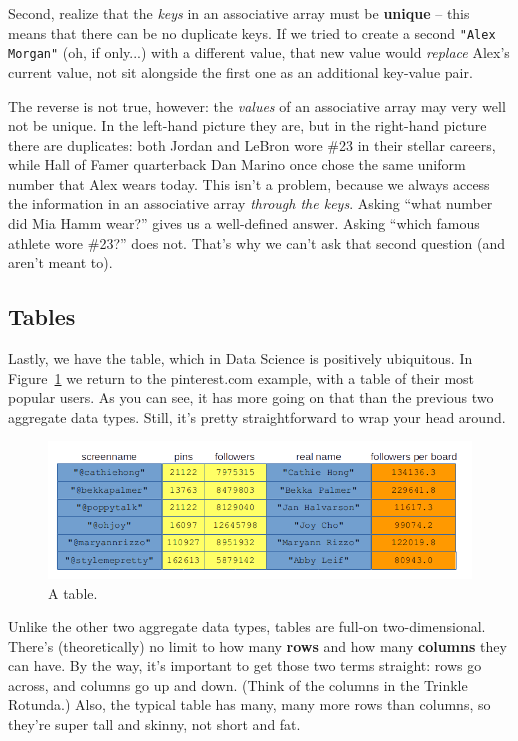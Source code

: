 Second, realize that the \textit{keys} in an associative array must be
\textbf{unique} -- this means that there can be no duplicate keys. If we tried
to create a second \texttt{"Alex Morgan"} (oh, if only...) with a different
value, that new value would \textit{replace} Alex's current value, not sit
alongside the first one as an additional key-value pair.

The reverse is not true, however: the \textit{values} of an associative array
may very well not be unique. In the left-hand picture they are, but in the
right-hand picture there are duplicates: both Jordan and LeBron wore \#23 in
their stellar careers, while Hall of Famer quarterback Dan Marino once chose
the same uniform number that Alex wears today. This isn't a problem, because we
always access the information in an associative array \textit{through the
keys}. Asking ``what number did Mia Hamm wear?'' gives us a well-defined
answer. Asking ``which famous athlete wore \#23?'' does not. That's why we
can't ask that second question (and aren't meant to).

\subsection{Tables}

Lastly, we have the table, which in Data Science is positively ubiquitous. In
Figure~\ref{fig:table} we return to the pinterest.com example, with a table of
their most popular users. As you can see, it has more going on that than the
previous two aggregate data types. Still, it's pretty straightforward to wrap
your head around.

\begin{figure}[ht]
\centering
\includegraphics[width=\textwidth]{table.png}
\caption{A table.}
\label{fig:table}
\end{figure}

Unlike the other two aggregate data types, tables are full-on two-dimensional.
There's (theoretically) no limit to how many \textbf{rows} and how many
\textbf{columns} they can have. By the way, it's important to get those two
terms straight: rows go across, and columns go up and down. (Think of the
columns in the Trinkle Rotunda.) Also, the typical table has many, many more
rows than columns, so they're super tall and skinny, not short and fat.

